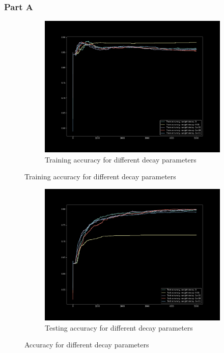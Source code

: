 \subsubsection{Part A}

\begin{figure}[H]
    \begin{subfigure}{1\textwidth}
        \centering
        \includegraphics[width=0.8\linewidth]{assets/plots/part1_Q4a_3.png}
        \caption{Training accuracy for different decay parameters}
        \label{fig:train_decay}
    \end{subfigure}
\end{figure}
\begin{figure}[H]
    \ContinuedFloat
    \begin{subfigure}{1\textwidth}
        \centering
        \includegraphics[width=0.8\linewidth]{assets/plots/part1_Q4a_2.png}
        \caption{Testing accuracy for different decay parameters}
        \label{fig:test_decay}
    \end{subfigure}
    \caption{Accuracy for different decay parameters}
    \label{decay}
\end{figure}

